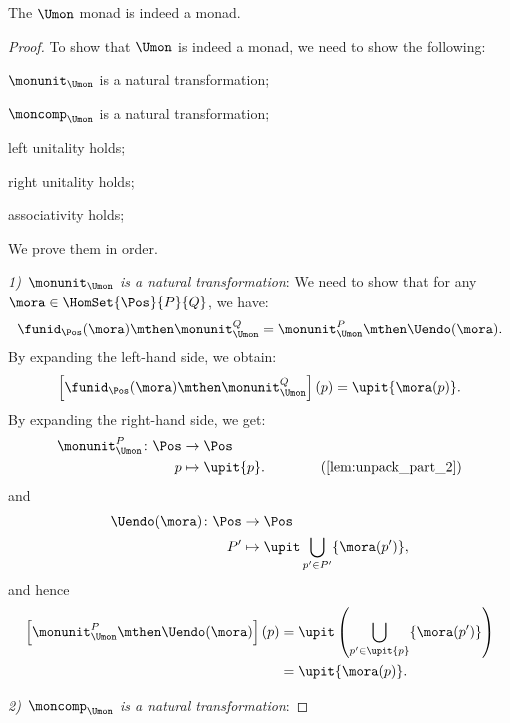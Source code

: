\begin{lemma}
  The $\Umon$ monad is indeed a monad.
\end{lemma}
\begin{proof}
  To show that $\Umon$ is indeed a monad, we need to show the following:
  \begin{compactenum}
    \item $\monunit_{\Umon}$ is a natural transformation;
    \item $\moncomp_{\Umon}$ is a natural transformation;
    \item left unitality holds;
    \item right unitality holds;
    \item associativity holds;
  \end{compactenum}
  We prove them in order.

  \emph{1)~$\monunit_{\Umon}$ is a natural transformation}: We need to show that for any~$\mora\in \HomSet{\Pos}{P}{Q}$, we have:
  \begin{equation}
    \funid_{\Pos}(\mora)\mthen \monunit_{\Umon}^Q=\monunit_{\Umon}^P\mthen \Uendo(\mora).
  \end{equation}
  By expanding the left-hand side, we obtain:
  \begin{equation}
    \left[\funid_{\Pos}(\mora)\mthen \monunit_{\Umon}^Q\right](p)=\upit \{\mora(p)\}.
  \end{equation}
  By expanding the right-hand side, we get:
  \begin{equation}
    \begin{aligned}
      \monunit_{\Umon}^P\colon \Pos &\to \Pos\\
      p&\mapsto \upit \{p\}. \qquad \qquad (\cref{lem:unpack_part_2})
    \end{aligned}
  \end{equation}
  and
  \begin{equation}
    \begin{aligned}
      \Uendo(\mora)\colon \Pos &\to \Pos\\
      P'&\mapsto \upit \bigcup_{p'\in P'}\{\mora(p')\},
    \end{aligned}
  \end{equation}
  and hence
  \begin{equation}
    \begin{aligned}
      \left[\monunit_{\Umon}^P\mthen \Uendo(\mora)\right](p)&=\upit \left( \bigcup_{p'\in \upit \{p\}} \{\mora(p')\}\right)\\
      &=\upit \{\mora(p)\}.
    \end{aligned}
  \end{equation}

  \emph{2)~$\moncomp_{\Umon}$ is a natural transformation}:
\end{proof}
